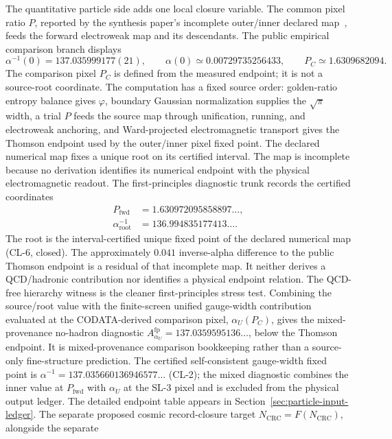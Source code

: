 \documentclass[11pt]{article}
\begin{document}
The quantitative particle side adds one local closure variable. The common pixel ratio \(P\),
reported by the synthesis paper's incomplete outer/inner declared map~\cite{ophsynthesis}, feeds the forward
electroweak map and its descendants. The public empirical comparison branch displays
\[
\alpha^{-1}(0)=137.035999177(21),
\qquad
\alpha(0)\simeq0.00729735256433,
\qquad
P_C\simeq1.6309682094.
\]
The comparison pixel \(P_C\) is defined from the measured endpoint; it is not a source-root
coordinate.
The computation has a fixed source order: golden-ratio entropy balance gives
\(\varphi\), boundary Gaussian normalization supplies the \(\sqrt{\pi}\) width,
a trial \(P\) feeds the source map through unification, running, and electroweak
anchoring, and Ward-projected electromagnetic transport gives the Thomson
endpoint used by the outer/inner pixel fixed point.
The declared numerical map fixes a unique root on its certified interval. The map is
incomplete because no derivation identifies its numerical endpoint with the physical
electromagnetic readout. The
first-principles diagnostic trunk records the certified coordinates
\[
\begin{aligned}
P_{\mathrm{fwd}}&=1.630972095858897\ldots,\\
\alpha_{\mathrm{root}}^{-1}
&=136.994835177413\ldots.
\end{aligned}
\]
The root is the interval-certified unique fixed point of the declared numerical map
(CL-6, closed).
The approximately \(0.041\) inverse-alpha difference to the public Thomson endpoint is a residual
of that incomplete map. It neither derives a QCD/hadronic contribution nor identifies a physical
endpoint relation.
The QCD-free hierarchy witness is the cleaner first-principles stress test. Combining the source/root
value with the finite-screen unified gauge-width contribution evaluated at the CODATA-derived
comparison pixel, \(\alpha_U(P_C)\), gives the mixed-provenance no-hadron diagnostic
\(A_{\alpha_U}^{\mathrm{fp}}=137.0359595136\ldots\), below the Thomson endpoint. It is
mixed-provenance comparison bookkeeping rather than a source-only fine-structure prediction. The certified
self-consistent gauge-width fixed point is \(\alpha^{-1}=137.035660136946577\ldots\)
(CL-2); the mixed diagnostic combines the inner value at \(P_{\mathrm{fwd}}\) with
\(\alpha_U\) at the SL-3 pixel and is excluded from the physical output ledger.
The detailed endpoint table appears in Section~\ref{sec:particle-input-ledger}.
The separate proposed
cosmic record-closure target \(N_{\mathrm{CRC}}=F(N_{\mathrm{CRC}})\), alongside the separate
\end{document}
